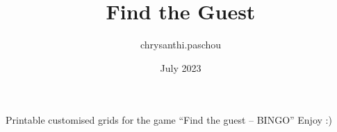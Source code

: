 \documentclass{article}
\title{Find the Guest}
\author{chrysanthi.paschou }
\date{July 2023}
\begin{document}
\maketitle

\centering
Printable customised grids for the game ``Find the guest -- BINGO'' Enjoy :)
\newpage


\end{document}
